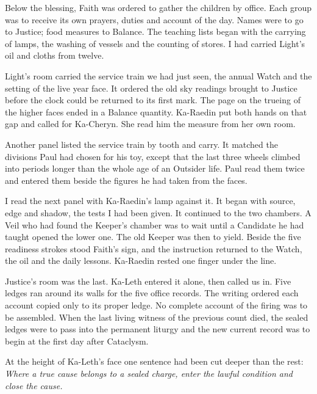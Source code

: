 Below the blessing, Faith was ordered to gather the children by office. Each group was to receive its own prayers, duties and account of the day. Names were to go to Justice; food measures to Balance. The teaching lists began with the carrying of lamps, the washing of vessels and the counting of stores. I had carried Light's oil and cloths from twelve.\par

Light's room carried the service train we had just seen, the annual Watch and the setting of the live year face. It ordered the old sky readings brought to Justice before the clock could be returned to its first mark. The page on the trueing of the higher faces ended in a Balance quantity. Ka-Raedin put both hands on that gap and called for Ka-Cheryn. She read him the measure from her own room.\par

Another panel listed the service train by tooth and carry. It matched the divisions Paul had chosen for his toy, except that the last three wheels climbed into periods longer than the whole age of an Outsider life. Paul read them twice and entered them beside the figures he had taken from the faces.\par

I read the next panel with Ka-Raedin's lamp against it. It began with source, edge and shadow, the tests I had been given. It continued to the two chambers. A Veil who had found the Keeper's chamber was to wait until a Candidate he had taught opened the lower one. The old Keeper was then to yield. Beside the five readiness strokes stood Faith's sign, and the instruction returned to the Watch, the oil and the daily lessons. Ka-Raedin rested one finger under the line.\par

Justice's room was the last. Ka-Leth entered it alone, then called us in. Five ledges ran around its walls for the five office records. The writing ordered each account copied only to its proper ledge. No complete account of the firing was to be assembled. When the last living witness of the previous count died, the sealed ledges were to pass into the permanent liturgy and the new current record was to begin at the first day after Cataclysm.\par

At the height of Ka-Leth's face one sentence had been cut deeper than the rest: \emph{Where a true cause belongs to a sealed charge, enter the lawful condition and close the cause.}\par

